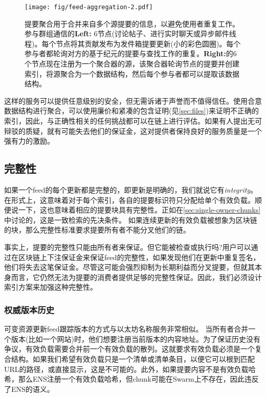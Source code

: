 \begin{figure}[htbp]
\centering
\texttt{[image: fig/feed-aggregation-2.pdf]}
\caption[提要聚合\statusyellow]{提要聚合用于合并来自多个源提要的信息，以避免使用者重复工作。参与群组通信的\textbf{Left:} 6节点(讨论帖子、进行实时聊天或异步邮件线程)。每个节点将其贡献发布为发件箱提要更新(小的彩色圆圈)。每个参与者都轮询对方的基于纪元的提要与查找工作的重复。\textbf{Right:}的6个节点现在注册为一个聚合器的源，该聚合器轮询节点的提要并创建索引，将源聚合为一个数据结构，然后每个参与者都可以提取该数据结构。}
\label{fig:feed-aggregation}
\end{figure}

这样的服务可以提供任意级别的安全，但无需诉诸于声誉而不值得信任。使用合意数据结构进行聚合，可以使用廉价和紧凑的包含证明(见\ref{sec:files})来证明不正确的索引，因此，与正确性相关的任何挑战都可以在链上进行评估。如果有人提出无可辩驳的质疑，就有可能失去他们的保证金，这对提供者保持良好的服务质量是一个强有力的激励。

\subsection{完整性\statusyellow}\label{sec:feed-integrity}

如果一个feed的每个更新都是完整的，即更新是明确的，我们就说它有\emph{integrity}。在形式上，这意味着对于每个索引，各自的提要标识符只分配给单个有效负载。顺便说一下，这也意味着相应的提要块具有完整性。正如在\ref{sec:single-owner-chunks}中讨论的，这是一致检索的先决条件。 
如果连续更新的有效负载被想象为区块链的块，那么完整性标准要求提要所有者不能分叉他们的链。

事实上，提要的完整性只能由所有者来保证。但它能被检查或执行吗?用户可以通过在区块链上下注保证金来保证feed的完整性，如果发现他们在更新中重复签名，他们将失去这笔保证金。尽管这可能会强烈抑制为长期利益而分叉提要，但就其本身而言，它仍然无法为提要的消费者提供足够的完整性保证。因此，我们必须设计索引方案来加强这种完整性。

\subsubsection{权威版本历史}

可变资源更新feed跟踪版本的方式与以太坊名称服务非常相似。
当所有者合并一个版本(比如一个网站)时，他们想要注册当前版本的内容地址。为了保证历史没有争议，有效负载需要合并前一个有效负载的散列。这就要求有效负载必须是一个复合结构。如果我们希望有效负载只是一个清单或清单条目，以便它可以根到匹配URL的路径，或直接显示，这是不可能的。此外，如果提要内容不是有效负载哈希，那么ENS注册一个有效负载哈希，但chunk可能在Swarm上不存在，因此违反了ENS的语义。


